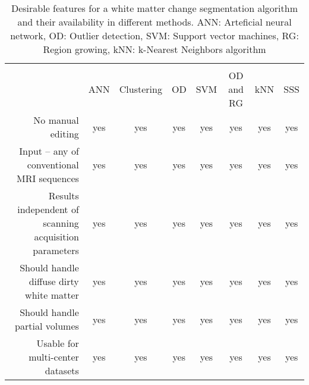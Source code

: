 \begin{table}
\centering
    \begin{tabular}  {  r | c c c c c c c }
         & \cite{Zijdenbos_2002} & \cite{LesionTOADS_2010} & \cite{OutlierLocalIntensity_2011} & \cite{CascadeOrig} & \cite{LesionSegmentationToolbox_2012} & \cite{kNN-TTPs_2013} & \cite{Rotation-invariant_2015} \\
         & ANN  & Clustering  & OD  & SVM  & OD and RG  & kNN \cite{kNN-TTPs_2013} & SSS \newline \cite{Rotation-invariant_2015} \\
    \hline %
        No manual editing                                      & yes & yes & yes & yes & yes & yes & yes \\ 
        Input – any of conventional MRI sequences              & yes & yes & yes & yes & yes & yes & yes \\ 
        Results independent of scanning acquisition parameters & yes & yes & yes & yes & yes & yes & yes \\ 
        Should handle diffuse dirty white matter               & yes & yes & yes & yes & yes & yes & yes \\ 
        Should handle partial volumes                          & yes & yes & yes & yes & yes & yes & yes \\ 
        Usable for multi-center datasets                       & yes & yes & yes & yes & yes & yes & yes \\ 
    \hline
    \end{tabular} 
    \caption{Desirable features for a white matter change segmentation algorithm and their availability in different methods. ANN: Arteficial neural network, OD: Outlier detection, SVM: Support vector machines, RG: Region growing, kNN: k-Nearest Neighbors algorithm} 
    \label{Table:Other_Methods}
\end{table}
  
  
  
  
  
  
  